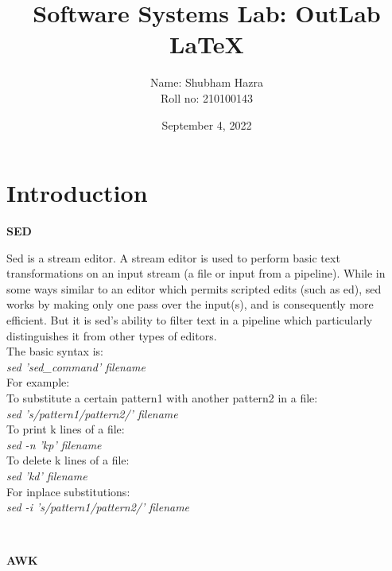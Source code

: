 \documentclass[12pt]{article}
\title{\textbf{Software Systems Lab: OutLab \\ \LaTeX{}}}
\author{Name: Shubham Hazra\\Roll no: 210100143}
\date{\Large{September 4, 2022}}
\begin{document}
\maketitle
\newpage

\tableofcontents
\newpage

\section{Introduction}
\vspace*{2em}
\begin{center}
    {\Large{\textbf{SED}}}
\end{center}
\fbox
{
\begin{minipage}{\textwidth}
    Sed is a stream editor. A stream editor is used to perform basic text 
    transformations on an input stream (a file or input from a pipeline). 
    While in some ways similar to an editor which permits scripted edits 
    (such as ed), sed works by making only one pass over the input(s), and is 
    consequently more efficient. But it is sed’s ability to filter text in a 
    pipeline which particularly distinguishes it from other types of editors.
    \\
    The basic syntax is:\\
    \emph{sed 'sed\_command' filename}\\
    For example:\\ To substitute a certain pattern1 with another pattern2 in a file:\\
    \emph{sed 's/pattern1/pattern2/' filename}
    \\
    To print k lines of a file:\\
    \emph{sed -n 'kp' filename}\\
    To delete k lines of a file:\\
    \emph{sed 'kd' filename}\\
    For inplace substitutions:\\
    \emph{sed -i 's/pattern1/pattern2/' filename}
\end{minipage}
}\\
\begin{center}
    {\Large{\textbf{AWK}}}
\end{center}
\fbox
\end{document}
